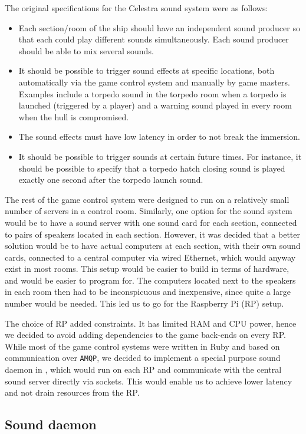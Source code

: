 The original specifications for the Celestra sound system were as follows:
\begin{itemize}
\item Each section/room of the ship should have an independent sound producer so that each could play different sounds simultaneously. Each sound producer should be able to mix several sounds.
\item It should be possible to trigger sound effects at specific
  locations, both automatically via the game control system and
  manually by game masters. Examples include a torpedo sound in the
  torpedo room when a torpedo is launched (triggered by a player) and
  a warning sound played in every room when the hull is compromised.
\item The sound effects must have low latency in order to not break the immersion.
\item It should be possible to trigger sounds at certain future times. For instance, it should be possible to specify that a torpedo hatch closing sound is played exactly one second after the torpedo launch sound.
\end{itemize}

The rest of the game control system were designed to run on a
relatively small number of servers in a control room. Similarly, one
option for the sound system would be to have a sound server with one
sound card for each section, connected to pairs of speakers located
in each section. However, it was decided that a better solution would
be to have actual computers at each section, with their own sound
cards, connected to a central computer via wired Ethernet, which would
anyway exist in most rooms. This setup would be easier to build in
terms of hardware, and would be easier to program for. The computers
located next to the speakers in each room then had to be inconspicuous
and inexpensive, since quite a large number would be needed. This led us to go
for the Raspberry Pi (RP) setup.

The choice of RP added constraints. It has limited RAM and CPU power,
hence we decided to avoid adding dependencies to the game back-ends on
every RP. While most of the game control systems were written in Ruby
and based on communication over \texttt{AMQP}, we decided to implement a
special purpose sound daemon in \Cpp, which would run on each RP and
communicate with the central sound server directly via sockets. This
would enable us to achieve lower latency and not drain resources from
the RP.

\subsection{Sound daemon}

